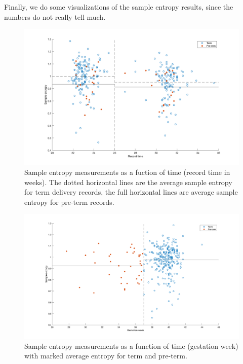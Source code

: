 \documentclass[a4paper,11pt]{article}
\begin{document}
Finally, we do some visualizations of the sample entropy results, since the numbers do not really tell much.
\begin{figure}[ht!]
    \centering
    \includegraphics[width=150mm]{sample_averages.png}
    \caption{Sample entropy measurements as a fuction of time (record time in weeks). The dotted horizontal lines are the average sample entropy for term delivery records, the full horizontal lines are average sample entropy for pre-term records.}
\end{figure}

\begin{figure}[ht!]
    \centering
    \includegraphics[width=150mm]{sample_entropy_gestation.png}
    \caption{Sample entropy measurements as a function of time (gestation week) with marked average entropy for term and pre-term.}
\end{figure}

\newpage
\end{document}
